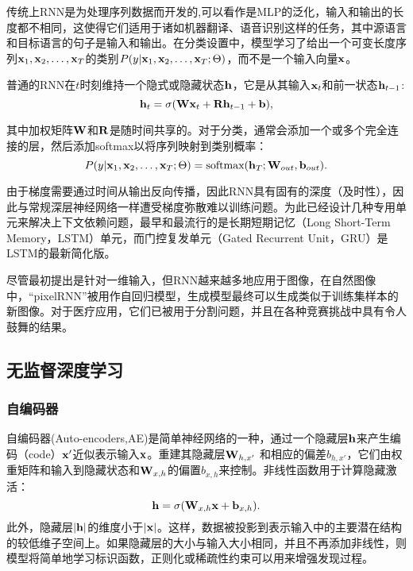 传统上RNN是为处理序列数据而开发的,可以看作是MLP的泛化，输入和输出的长度都不相同，这使得它们适用于诸如机器翻译、语音识别这样的任务，其中源语言和目标语言的句子是输入和输出。在分类设置中，模型学习了给出一个可变长度序列${\bf x}_{1}, {\bf x}_{2}, \ldots, {\bf x}_{T}$的类别$P(y | {\bf x}_{1}, {\bf x}_{2}, \ldots, {\bf x}_{T}; \Theta)$，而不是一个输入向量${\bf x}$。

普通的RNN在$t$时刻维持一个隐式或隐藏状态${\bf h} $，它是从其输入${\bf x}_{t}$和前一状态${\bf h}_{t-1}$:
\begin{equation}
 {\bf h}_{t} = \sigma({\bf W}{\bf x}_{t} + {\bf R}{\bf h}_{t - 1} + {\bf b}),
\end{equation}

其中加权矩阵${\bf W}$和${\bf R}$是随时间共享的。对于分类，通常会添加一个或多个完全连接的层，然后添加softmax以将序列映射到类别概率： 
\begin{equation}
 P(y | {\bf x}_{1}, {\bf x}_{2}, \ldots, {\bf x}_{T}; \Theta) = \text{softmax}( {\bf h}_{T}; {\bf W}_{out}, {\bf b}_{out}).
\end{equation}

由于梯度需要通过时间从输出反向传播，因此RNN具有固有的深度（及时性），因此与常规深层神经网络一样遭受梯度弥散难以训练问题。为此已经设计几种专用单元来解决上下文依赖问题，最早和最流行的是长期短期记忆（Long Short-Term Memory，LSTM）单元\citep{Hochreiter1997Long}，而门控复发单元（Gated Recurrent Unit，GRU）\citep{Cho2014Learning}是LSTM的最新简化版。

尽管最初提出是针对一维输入，但RNN越来越多地应用于图像，在自然图像中，“pixelRNN”被用作自回归模型，生成模型最终可以生成类似于训练集样本的新图像。对于医疗应用，它们已被用于分割问题，并且在各种竞赛挑战中具有令人鼓舞的结果\citep{Stollenga2015Parallel}。

\subsection{无监督深度学习}
\subsubsection{自编码器}
自编码器(Auto-encoders,AE)是简单神经网络的一种，通过一个隐藏层${\bf h}$来产生编码（code）${\bf x}'$近似表示输入${\bf x}$。重建其隐藏层${\bf W}_{h, x'}$ 和相应的偏差$b_{h, x'}$，它们由权重矩阵和输入到隐藏状态和${\bf W}_{x, h}$的偏置$b_{x, h}$来控制。非线性函数用于计算隐藏激活： 
\begin{equation}
\label{eq::ae_projection}
 {\bf h} = \sigma({\bf W}_{x, h} {\bf x} + {\bf b}_{x, h}).
\end{equation}
此外，隐藏层$|{\bf h}|$的维度小于$|{\bf x}|$。这样，数据被投影到表示输入中的主要潜在结构的较低维子空间上。如果隐藏层的大小与输入大小相同，并且不再添加非线性，则模型将简单地学习标识函数，正则化或稀疏性约束可以用来增强发现过程。

